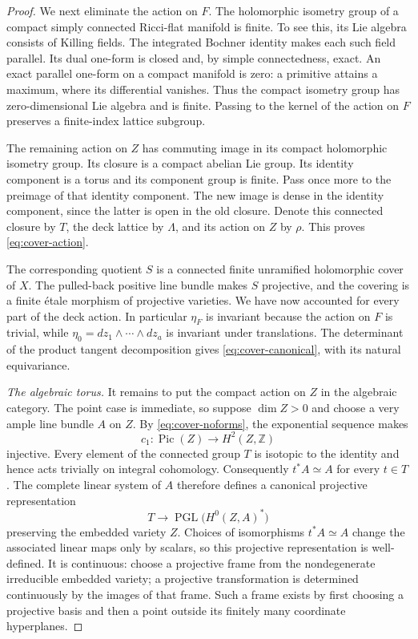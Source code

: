 \begin{proof}
We next eliminate the action on $F$.  The holomorphic isometry group
of a compact simply connected Ricci-flat manifold is finite.  To see
this, its Lie algebra consists of Killing fields.  The integrated
Bochner identity makes each such field parallel.  Its dual one-form
is closed and, by simple connectedness, exact.  An exact parallel
one-form on a compact manifold is zero: a primitive attains a maximum,
where its differential vanishes.  Thus the compact isometry group has
zero-dimensional Lie algebra and is finite.  Passing to the kernel of
the action on $F$ preserves a finite-index lattice subgroup.

The remaining action on $Z$ has commuting image in its compact
holomorphic isometry group.  Its closure is a compact abelian Lie
group.  Its identity component is a torus and its component group is
finite.  Pass once more to the preimage of that identity component.
The new image is dense in the identity component, since the latter is
open in the old closure.  Denote this connected closure by $T$, the
deck lattice by $\Lambda$, and its action on $Z$ by $\rho$.  This
proves \eqref{eq:cover-action}.

The corresponding quotient $S$ is a connected finite unramified
holomorphic cover of $X$.  The pulled-back positive line bundle
makes $S$ projective, and the covering is a finite \'etale
morphism of projective varieties.  We have now accounted for every
part of the deck action.  In particular $\eta_F$ is invariant because
the action on $F$ is trivial, while
$\eta_0=dz_1\wedge\cdots\wedge dz_a$ is invariant under translations.
The determinant of the product tangent decomposition gives
\eqref{eq:cover-canonical}, with its natural equivariance.

\smallskip\noindent
\emph{The algebraic torus.}
It remains to put the compact action on $Z$ in the algebraic category.
The point case is immediate, so suppose $\dim Z>0$ and choose a very
ample line bundle $A$ on $Z$.  By \eqref{eq:cover-noforms}, the
exponential sequence makes
\[
                 c_1:\operatorname{Pic}(Z)\longrightarrow
                      H^2(Z,\mathbb Z)
\]
injective.  Every element of the connected group $T$ is isotopic to
the identity and hence acts trivially on integral cohomology.
Consequently $t^*A\simeq A$ for every $t\in T$.
The complete linear system of $A$ therefore defines a canonical
projective representation
\[
           T\longrightarrow
           \operatorname{PGL}\bigl(H^0(Z,A)^*\bigr)
\]
preserving the embedded variety $Z$.  Choices of isomorphisms
$t^*A\simeq A$ change the associated linear maps only by scalars,
so this projective representation is well-defined.
It is continuous: choose a projective frame from the nondegenerate
irreducible embedded variety; a projective transformation is
determined continuously by the images of that frame.  Such a frame
exists by first choosing a projective basis and then a point outside
its finitely many coordinate hyperplanes.


\end{proof}

